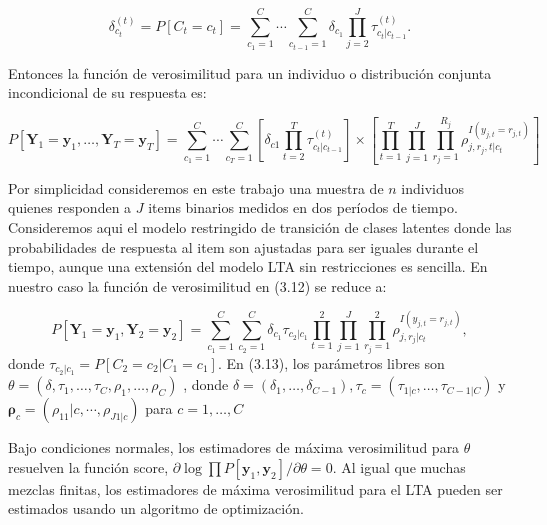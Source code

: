 	\begin{equation}
		\delta_{c_{t}}^{(t)}=P\left[C_{t}=c_{t}\right]=\sum_{c_{1}=1}^{C} \cdots \sum_{c_{t-1}=1}^{C} \delta_{c_{1}} \prod_{j=2}^{J} \tau_{c_{t} | c_{t-1}}^{(t)}. \label{3.12}     
	\end{equation}
	
	Entonces la función de verosimilitud para un individuo o distribución conjunta incondicional de su respuesta es:
	
	\begin{equation}
		P\left[\mathbf{Y}_{1}=\mathbf{y}_{1}, \ldots, \mathbf{Y}_{T}=\mathbf{y}_{T}\right]=\sum_{c_{1}=1}^{C} \cdots \sum_{c_{T}=1}^{C} \left[ { \delta  }_{ c1 }\prod _{ t=2 }^{ T }{ { \tau  }_{ { c }_{ t }|{ c }_{ t-1 } }^{ (t) } }  \right] \times \left[ \prod _{ t=1 }^{ T }{ \prod _{ j=1 }^{ J }{ \prod _{ r_{j}=1 }^{ { R }_{ j } }{ { \rho  }_{ j,r_{j},t|{ c }_{ t } }^{ I({ y }_{ j,t }=r_{j,t}) } }  }  }  \right] \label{3.13}
	\end{equation}
	
	Por simplicidad consideremos en este trabajo una muestra de $n$ individuos quienes responden a $J$ items binarios medidos en dos per\'{i}odos de tiempo. Consideremos aqui el modelo restringido de transici\'{o}n de clases latentes donde las probabilidades de respuesta al item son ajustadas para ser iguales durante el tiempo, aunque una extensi\'{o}n del modelo LTA sin restricciones es sencilla. En nuestro caso la funci\'{o}n de verosimilitud en (3.12) se reduce a:
	
	\begin{equation}
		P\left[\mathbf{Y}_{1}=\mathbf{y}_{1}, \mathbf{Y}_{2}=\mathbf{y}_{2}\right]=\sum _{ {c}_{1}=1 }^{C}{\sum _{ {c}_{2}=1 }^{C}{\delta _{c_1} \tau_{c_2|c_1} }}\prod _{ t=1 }^{ 2 }{  \prod_{ j=1 }^{J}{\prod_{ r_{j}=1 }^{2}{\rho_{j,r_{j}|c_t}^{I(y_{j,t}=r_{j,t})}}}},\label{3.14}
	\end{equation}
donde $\tau_{c_{2} | c_{1}}=P\left[C_{2}=c_{2} | C_{1}=c_{1}\right]$. 
	En (3.13), los par\'{a}metros libres son $\theta=\left(\delta, \tau_{1}, \dots, \tau_{C}, \rho_{1}, \dots, \rho_{C}\right)$ , donde $\delta=\left(\delta_{1}, \ldots, \delta_{C-1}\right), \tau_{c}=\left(\tau_{1 | c}, \ldots, \tau_{C-1 | C}\right)$ y $\boldsymbol{\rho}_{c}=\left(\rho_{11} | c, \cdots, \rho_{J 1 | c}\right)$ para $c=1, \dots, C$
	
	Bajo condiciones normales, los estimadores de m\'{a}xima verosimilitud para $\theta$ resuelven la funci\'{o}n score, $\partial \log \prod P\left[\mathbf{y}_{1}, \mathbf{y}_{2}\right] / \partial \theta=0$. Al igual que muchas mezclas finitas, los estimadores de m\'{a}xima verosimilitud para el LTA pueden ser estimados usando un algoritmo de optimización.
	
